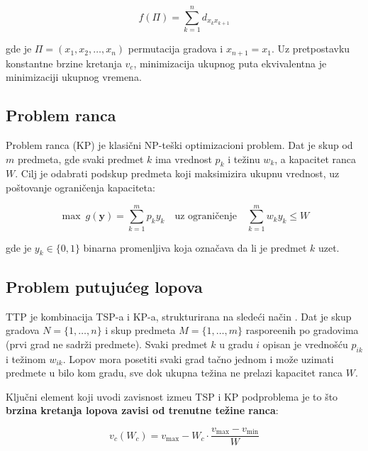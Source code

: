 \documentclass[12pt,a4paper]{article}
\begin{document}
\begin{equation}
    f(\Pi) = \sum_{k=1}^{n} d_{x_k x_{k+1}}
\end{equation}

gde je $\Pi = (x_1, x_2, \ldots, x_n)$ permutacija gradova i $x_{n+1} = x_1$. Uz pretpostavku konstantne brzine kretanja $v_c$, minimizacija ukupnog puta ekvivalentna je minimizaciji ukupnog vremena.

\subsection{Problem ranca}

Problem ranca (KP) je klasični NP-te\v{s}ki optimizacioni problem. Dat je skup od $m$ predmeta, gde svaki predmet $k$ ima vrednost $p_k$ i te\v{z}inu $w_k$, a kapacitet ranca $W$. Cilj je odabrati podskup predmeta koji maksimizira ukupnu vrednost, uz po\v{s}tovanje ograni\v{c}enja kapaciteta:

\begin{equation}
    \max \ g(\mathbf{y}) = \sum_{k=1}^{m} p_k y_k \quad \text{uz ograni\v{c}enje} \quad \sum_{k=1}^{m} w_k y_k \leq W
\end{equation}

gde je $y_k \in \{0, 1\}$ binarna promenljiva koja ozna\v{c}ava da li je predmet $k$ uzet.

\subsection{Problem putuju\'{c}eg lopova}

TTP je kombinacija TSP-a i KP-a, strukturirana na slede\'{c}i na\v{c}in \cite{polyakovskiy2014}. Dat je skup gradova $N = \{1, \ldots, n\}$ i skup predmeta $M = \{1, \ldots, m\}$ raspore\dj{}enih po gradovima (prvi grad ne sadr\v{z}i predmete). Svaki predmet $k$ u gradu $i$ opisan je vrednoš\'{c}u $p_{ik}$ i te\v{z}inom $w_{ik}$. Lopov mora posetiti svaki grad ta\v{c}no jednom i mo\v{z}e uzimati predmete u bilo kom gradu, sve dok ukupna te\v{z}ina ne prelazi kapacitet ranca $W$.

Klju\v{c}ni element koji uvodi zavisnost izme\dj{}u TSP i KP podproblema je to \v{s}to \textbf{brzina kretanja lopova zavisi od trenutne te\v{z}ine ranca}:

\begin{equation}
    v_c(W_c) = v_{\max} - W_c \cdot \frac{v_{\max} - v_{\min}}{W}
    \label{eq:speed}
\end{equation}
\end{document}
